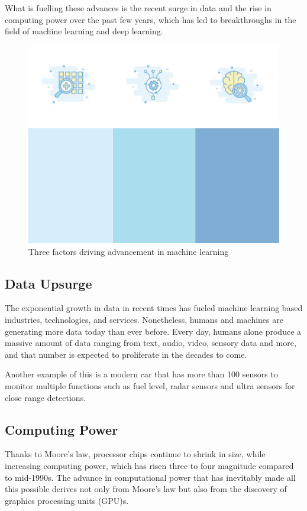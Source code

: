 What is fuelling these advances is the recent surge in data and the rise in computing power over the past few years, which has led to breakthroughs in the field of machine learning and deep learning.

\begin{figure}[htbp]
\centering
\includegraphics[width=1\textwidth]{images/bg-3-power.png}
\caption{Three factors driving advancement in machine learning}
\label{3-factors}
\end{figure}

\subsection{Data Upsurge}
The exponential growth in data in recent times has fueled machine learning based industries, technologies, and services. Nonetheless, humans and machines are generating more data today than ever before. Every day, humans alone produce a massive amount of data ranging from text, audio, video, sensory data and more, and that number is expected to proliferate in the decades to come. 

Another example of this is a modern car that has more than 100 sensors to monitor multiple functions such as fuel level, radar sensors and ultra sensors for close range detections.

\subsection{Computing Power}
Thanks to Moore’s law, processor chips continue to shrink in size, while increasing computing power, which has risen three to four magnitude compared to mid-1990s. The advance in computational power that has inevitably made all this possible derives not only from Moore’s law but also from the discovery of graphics processing units (GPU)s.

